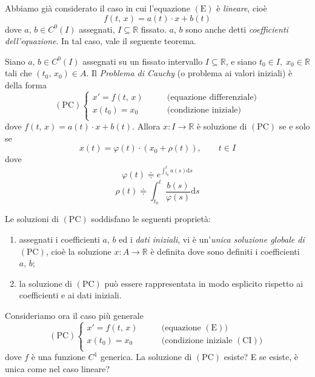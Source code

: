 Abbiamo già considerato il caso in cui l'equazione $\mathrm{(E)}$ è \emph{lineare}, cioè
$$
f(t,\,x) = a(t) \cdot x + b(t)
$$
dove $a,\,b \in C^0(I)$ assegnati, $I \subseteq \mathbb{R}$ fissato. $a,\,b$ sono anche detti \emph{coefficienti dell'equazione}. In tal caso, vale il seguente teorema.

\begin{thm}
Siano $a,\,b \in C^0(I)$ assegnati su un fissato intervallo $I \subseteq \mathbb{R}$, e siano $t_0 \in I,\; x_0 \in \mathbb{R}$ tali che $(t_0,\,x_0) \in A$. Il \emph{Problema di Cauchy} (o problema ai valori iniziali) è della forma
$$
\mathrm{(PC)}
\begin{cases}
x' = f(t,\,x) &\qquad \text{(equazione differenziale)}\\
x(t_0) = x_0 &\qquad \text{(condizione iniziale)}\\
\end{cases}
$$
dove $f(t,\,x) = a(t) \cdot x + b(t)$. Allora $x : I \longrightarrow \mathbb{R}$ è soluzione di $\mathrm{(PC)}$ se e solo se
$$
x(t) = \varphi(t) \cdot \left( x_0 + \rho(t) \right), \qquad t \in I
$$
dove
$$
\varphi(t) \doteqdot e^{\int_{t_0}^{t} a(s) \mathrm{d}s}
$$
$$
\rho(t) \doteqdot \int_{t_0}^{t} \frac{b(s)}{\varphi(s)} \mathrm{d}s
$$
\end{thm}

\begin{obs}[importante]
Le soluzioni di $\mathrm{(PC)}$ soddisfano le seguenti proprietà:
\begin{enumerate}[labelindent=\parindent,leftmargin=*,label=\textnormal{(\roman*)},start=1]
\item assegnati i coefficienti $a,\,b$ ed i \emph{dati iniziali}, vi è un'\emph{unica soluzione globale di $\mathrm{(PC)}$}, cioè la soluzione $x : A \longrightarrow \mathbb{R}$ è definita dove sono definiti i coefficienti $a,\,b$;

\item la soluzione di $\mathrm{(PC)}$ può essere rappresentata in modo esplicito rispetto ai coefficienti e ai dati iniziali.
\end{enumerate}
\end{obs}

\noindent Consideriamo ora il caso più generale
$$
\mathrm{(PC)}
\begin{cases}
x' = f(t,\,x) &\qquad \text{(equazione $\mathrm{(E)}$)}\\
x(t_0) = x_0 &\qquad \text{(condizione iniziale $\mathrm{(CI)}$)}\\
\end{cases}
$$
dove $f$ è una funzione $C^1$ generica. La soluzione di $\mathrm{(PC)}$ esiste? E se esiste, è unica come nel caso lineare?

